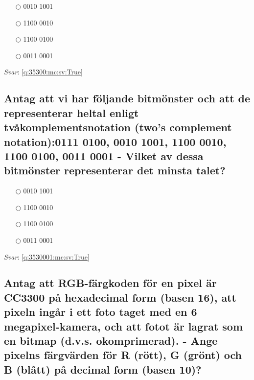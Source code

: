 \documentclass[a4paper,11pt,oneside]{article}
\begin{document}
\begin{sloppypar}
\label{q:35300:mc:sv:False}

\begin{itemize}
  \item[$\bigcirc$] 0010 1001
  \item[$\bigcirc$] 1100 0010
  \item[$\bigcirc$] 1100 0100
  \item[$\bigcirc$] 0011 0001
\end{itemize}

\vspace{1cm}

\textit{Svar}: \autoref{q:35300:mc:sv:True}

\subsection{Antag att vi har f\"oljande bitm\"onster och att de representerar heltal enligt tv\r{a}komplementsnotation (two{\textquoteright}s complement notation):0111 0100, 0010 1001, 1100 0010, 1100 0100, 0011 0001 - Vilket av dessa bitm\"onster representerar det minsta talet?}

\label{q:3530001:mc:sv:False}

\begin{itemize}
  \item[$\bigcirc$] 0010 1001
  \item[$\bigcirc$] 1100 0010
  \item[$\bigcirc$] 1100 0100
  \item[$\bigcirc$] 0011 0001
\end{itemize}

\vspace{1cm}

\textit{Svar}: \autoref{q:3530001:mc:sv:True}



\subsection{Antag att RGB-f\"argkoden f\"or en pixel \"ar CC3300 p\r{a} hexadecimal form (basen 16), att pixeln ing\r{a}r i ett foto taget med en 6 megapixel-kamera, och att fotot \"ar lagrat som en bitmap (d.v.s. okomprimerad). - Ange pixelns f\"argv\"arden f\"or R (r\"ott), G (gr\"ont) och B (bl\r{a}tt) p\r{a} decimal form (basen 10)?}

\label{q:35400:sa:sv:False}

\vspace{2cm}

\noindent\makebox[\textwidth]{\hrulefill}


\end{sloppypar}
\end{document}
